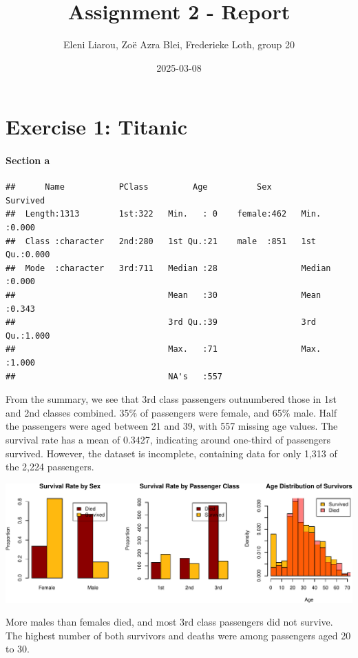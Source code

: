 \documentclass[
  11pt,
]{article}
\title{Assignment 2 - Report}
\author{Eleni Liarou, Zoë Azra Blei, Frederieke Loth, group 20}
\date{2025-03-08}
\begin{document}
\maketitle

\section{Exercise 1: Titanic}\label{exercise-1-titanic}

\paragraph{Section a}\label{section-a}

\begin{verbatim}
##      Name           PClass         Age          Sex         Survived    
##  Length:1313        1st:322   Min.   : 0    female:462   Min.   :0.000  
##  Class :character   2nd:280   1st Qu.:21    male  :851   1st Qu.:0.000  
##  Mode  :character   3rd:711   Median :28                 Median :0.000  
##                               Mean   :30                 Mean   :0.343  
##                               3rd Qu.:39                 3rd Qu.:1.000  
##                               Max.   :71                 Max.   :1.000  
##                               NA's   :557
\end{verbatim}

From the summary, we see that 3rd class passengers outnumbered those in
1st and 2nd classes combined. 35\% of passengers were female, and 65\%
male. Half the passengers were aged between 21 and 39, with 557 missing
age values. The survival rate has a mean of 0.3427, indicating around
one-third of passengers survived. However, the dataset is incomplete,
containing data for only 1,313 of the 2,224 passengers.

\includegraphics{ReportAssignment2_files/figure-latex/unnamed-chunk-2-1.pdf}

More males than females died, and most 3rd class passengers did not
survive. The highest number of both survivors and deaths were among
passengers aged 20 to 30.
\end{document}
